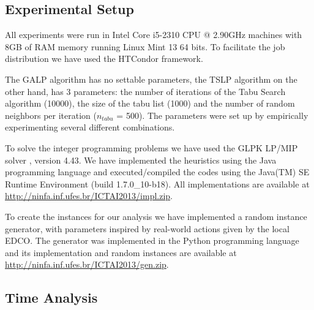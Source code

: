 
\subsection{Experimental Setup}
All experiments were run in Intel Core i5-2310 CPU @ 2.90GHz machines
with 8GB of RAM memory running Linux Mint 13 64 bits.  To facilitate the job distribution we have used the HTCondor framework.

The GALP algorithm has no settable parameters, the TSLP algorithm on the other hand,
has 3 parameters: the number of iterations of the Tabu Search algorithm (10000),
the size of the tabu list (1000) and the number of random neighbors per iteration
($n_{tabu}$ = 500).
The parameters were set up by empirically experimenting several different combinations.

To solve the integer programming problems we have used the GLPK LP/MIP solver \cite{GLPK},
version 4.43. We have implemented the heuristics using the Java programming language and
executed/compiled the codes using the Java(TM) SE Runtime Environment (build 1.7.0\_10-b18).
All implementations are available at \url{http://ninfa.inf.ufes.br/ICTAI2013/impl.zip}. 

To create the instances for our analysis we have implemented a random instance generator,
with parameters inspired by real-world actions given by the local EDCO.
The generator was implemented in the Python programming language and its implementation 
and random instances are available at \url{http://ninfa.inf.ufes.br/ICTAI2013/gen.zip}.

\subsection{Time Analysis}

